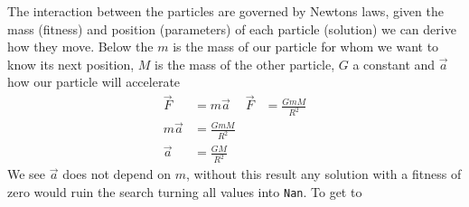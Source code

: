 The interaction between the particles are governed by Newtons laws, given the mass (fitness) and position (parameters) of each particle (solution) we can derive how they move. Below the $m$ is the mass of our particle for whom we want to know its next position, $M$ is the mass of the other particle, $G$ a constant and $\vec{a}$ how our particle will accelerate
%
\begin{align}
	\vec{F}&=m\vec{a} &            \vec{F}&=\frac{GmM}{R^2} \\
	m\vec{a} &= \frac{GmM}{R^2} \\
	\vec{a} &= \frac{GM}{R^2}
\end{align}
%
We see $\vec{a}$ does not depend on $m$, without this result any solution with a fitness of zero would ruin the search turning all values into \texttt{Nan}. To get to 

